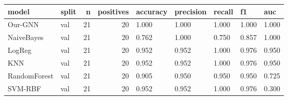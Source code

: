 \begin{tabular}{llrrlllll}
\toprule
model & split & n & positives & accuracy & precision & recall & f1 & auc \\
\midrule
Our-GNN & val & 21 & 20 & 1.000 & 1.000 & 1.000 & 1.000 & 1.000 \\
NaiveBayes & val & 21 & 20 & 0.762 & 1.000 & 0.750 & 0.857 & 1.000 \\
LogReg & val & 21 & 20 & 0.952 & 0.952 & 1.000 & 0.976 & 0.950 \\
KNN & val & 21 & 20 & 0.952 & 0.952 & 1.000 & 0.976 & 0.950 \\
RandomForest & val & 21 & 20 & 0.905 & 0.950 & 0.950 & 0.950 & 0.725 \\
SVM-RBF & val & 21 & 20 & 0.952 & 0.952 & 1.000 & 0.976 & 0.300 \\
\bottomrule
\end{tabular}
